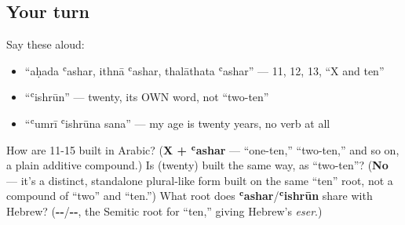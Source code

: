 \subsection*{Your turn}
Say these aloud:

\begin{itemize}
\raggedright
  \item \textquotedblleft{}aḥada ʿashar, ithnā ʿashar, thalāthata ʿashar\textquotedblright{} — 11, 12, 13, \textquotedblleft{}X and ten\textquotedblright{}
  \item \textquotedblleft{}ʿishrūn\textquotedblright{} — twenty, its OWN word, not \textquotedblleft{}two-ten\textquotedblright{}
  \item \textquotedblleft{}ʿumrī ʿishrūna sana\textquotedblright{} — my age is twenty years, no verb at all
\end{itemize}

\begin{tcolorbox}[breakable,colback=teal!4,colframe=teal!35!black,title={Before you move on}]
How are 11-15 built in Arabic? (\textbf{X + ʿashar} — \textquotedblleft{}one-ten,\textquotedblright{} \textquotedblleft{}two-ten,\textquotedblright{} and so on, a plain additive compound.) Is \textbf{} (twenty) built the same way, as \textquotedblleft{}two-ten\textquotedblright{}? (\textbf{No} — it's a distinct, standalone plural-like form built on the same \textquotedblleft{}ten\textquotedblright{} root, not a compound of \textquotedblleft{}two\textquotedblright{} and \textquotedblleft{}ten.\textquotedblright{}) What root does \textbf{ʿashar}/\textbf{ʿishrūn} share with Hebrew? (\textbf{--}/\textbf{--}, the Semitic root for \textquotedblleft{}ten,\textquotedblright{} giving Hebrew's \emph{eser}.)
\end{tcolorbox}
